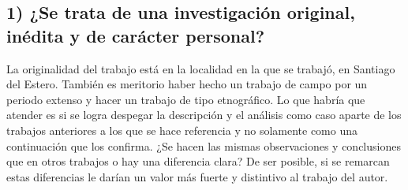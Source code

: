 \subsection*{1) ¿Se trata de una investigación original, inédita y de carácter personal?}\label{se-trata-de-una-investigaciuxf3n-original-inuxe9dita-y-de-caruxe1cter-personal}

La originalidad del trabajo está en la localidad en la que se trabajó,
en Santiago del Estero. También es meritorio haber hecho un trabajo de
campo por un periodo extenso y hacer un trabajo de tipo etnográfico. Lo
que habría que atender es si se logra despegar la descripción y el
análisis como caso aparte de los trabajos anteriores a los que se hace
referencia y no solamente como una continuación que los confirma. ¿Se
hacen las mismas observaciones y conclusiones que en otros trabajos o
hay una diferencia clara? De ser posible, si se remarcan estas
diferencias le darían un valor más fuerte y distintivo al trabajo del
autor.

